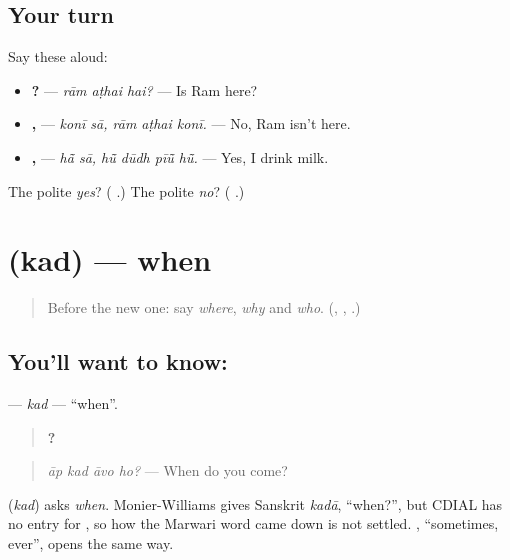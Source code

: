 \subsection*{Your turn}
Say these aloud:

\begin{itemize}
\raggedright
  \item \textbf{  ?} — \emph{rām aṭhai hai?} — Is Ram here?
  \item \textbf{ ,   } — \emph{konī sā, rām aṭhai konī.} — No, Ram isn't here.
  \item \textbf{ ,    } — \emph{hā̃ sā, hū̃ dūdh pīū̃ hū̃.} — Yes, I drink milk.
\end{itemize}

\begin{tcolorbox}[breakable,colback=teal!4,colframe=teal!35!black,title={Before you move on}]
The polite \emph{yes}? (\textbf{ }.) The polite \emph{no}? (\textbf{ }.)
\end{tcolorbox}
\section[\texorpdfstring{\mw{कद} (kad)}{कद (kad)}]{ (kad) — when}

\label{lesson:MW-C158-kad}



\begin{quote}
Before the new one: say \emph{where}, \emph{why} and \emph{who}. (\textbf{}, \textbf{}, \textbf{}.)
\end{quote}

\subsection*{You'll want to know: }
\textbf{} — \emph{kad} — \textquotedblleft{}when\textquotedblright{}.

\begin{quote}
\textbf{   ?}
\end{quote}

\begin{quote}
\emph{āp kad āvo ho?} — When do you come?
\end{quote}

\begin{cousinweb}
\textbf{} (\emph{kad}) asks \emph{when}. Monier-Williams gives Sanskrit \emph{kadā}, \textquotedblleft{}when?\textquotedblright{}, but CDIAL has no entry for \textbf{}, so how the Marwari word came down is not settled. \textbf{}, \textquotedblleft{}sometimes, ever\textquotedblright{}, opens the same way.
\end{cousinweb}

